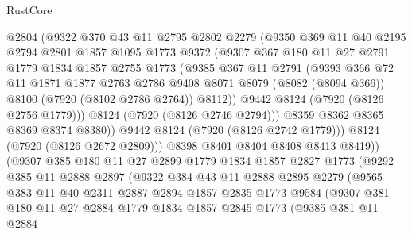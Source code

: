 \begin{lexlean}{RustCore}
\begin{coremodule}
              @2804
              (@9322
                @370
                @43
                @11
                @2795
                @2802
                @2279
                (@9350
                  @369
                  @11
                  @40
                  @2195
                  @2794
                  @2801
                  @1857
                  @1095
                  @1773
                  @9372
                  (@9307
                    @367
                    @180
                    @11
                    @27
                    @2791
                    @1779
                    @1834
                    @1857
                    @2755
                    @1773
                    (@9385
                      @367
                      @11
                      @2791
                      (@9393
                        @366
                        @72
                        @11
                        @1871
                        @1877
                        @2763
                        @2786
                        @9408
                        @8071
                        @8079
                        (@8082 (@8094 @366))
                        @8100
                        (@7920 (@8102 @2786 @2764))
                        @8112))
                    @9442
                    @8124
                    (@7920 (@8126 @2756 @1779)))
                  @8124
                  (@7920 (@8126 @2746 @2794)))
                @8359
                @8362
                @8365
                @8369
                @8374
                @8380))
            @9442
            @8124
            (@7920 (@8126 @2742 @1779)))
          @8124
          (@7920 (@8126 @2672 @2809)))
        @8398
        @8401
        @8404
        @8408
        @8413
        @8419))
    (@9307
      @385
      @180
      @11
      @27
      @2899
      @1779
      @1834
      @1857
      @2827
      @1773
      (@9292
        @385
        @11
        @2888
        @2897
        (@9322
          @384
          @43
          @11
          @2888
          @2895
          @2279
          (@9565
            @383
            @11
            @40
            @2311
            @2887
            @2894
            @1857
            @2835
            @1773
            @9584
            (@9307
              @381
              @180
              @11
              @27
              @2884
              @1779
              @1834
              @1857
              @2845
              @1773
              (@9385
                @381
                @11
                @2884

\end{coremodule}
\end{lexlean}
